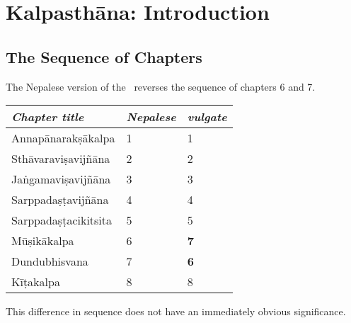 \chapter{Kalpasthāna: Introduction}

\section{The Sequence of Chapters}

The Nepalese version of the \SS\ reverses the sequence of chapters 6 and 7.  

\begin{table}[h]
    \centering
    \begin{tabular}{lll}
    \emph{Chapter title} & \emph{Nepalese} & \emph{vulgate}   \\
    \toprule
      Annapānarakṣākalpa   &  1 &  1 \\
     Sthāvaraviṣavijñāna & 2 &  2\\
     Jaṅgamaviṣavijñāna &  3 & 3 \\
     Sarppadaṣṭavijñāna & 4  &  4 \\
     Sarppadaṣṭacikitsita & 5 & 5 \\
     Mūṣikākalpa &  {6} & \textbf{7} \\
     Dundubhisvana & {7} & \textbf{6} \\
     Kīṭakalpa & 8 & 8 \\
    \bottomrule  
    \end{tabular}
\end{table}

This difference in sequence does not have an immediately obvious 
significance.